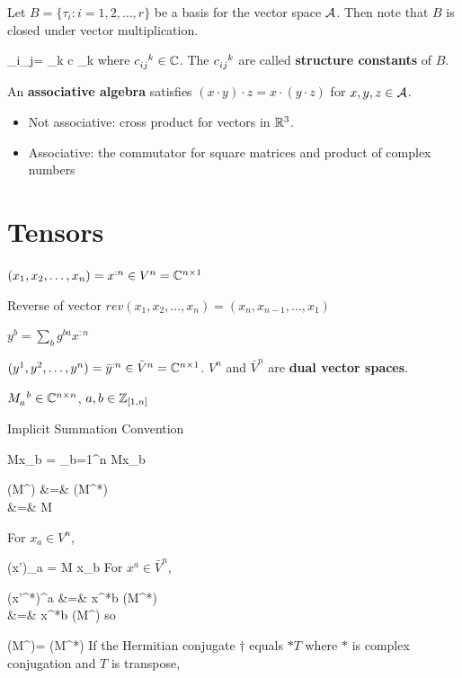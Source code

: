 Let $B = \{\tau_i: i=1, 2, \ldots, r\}$
be a basis for the vector space ${\cal A}$. 
Then note that
$B$ is closed under vector multiplication. 

\beq
\tau_i\cdot \tau_j=
\sum_k c \tau_k
\eeq
where $c\indices{_{ij}^k}\in\CC$.
The $c\indices{_{ij}^k}$ are called 
{\bf structure constants} of $B$.

An {\bf associative algebra} satisfies 
$(x\cdot y)\cdot z = x\cdot(y\cdot z)$ for
$x,y,z\in {\cal A}$.
\begin{itemize}
\item Not associative: cross product for vectors in  ${ \mathbb{R}}^3$.
\item Associative:
the commutator for square matrices and product of complex numbers
\end{itemize}

\section{Tensors}

$(x_1, x_2, \ldots, x_n) = x^{:n}\in V^n={ \mathbb{C}}^{n\times 1}$

Reverse of vector $rev(x_1, x_2, \ldots, x_n)=
(x_n, x_{n-1},
\ldots, x_1)$

$y^b = \sum_b g^{ba}x^{:n}$

$(y^1, y^2, \ldots, y^n)= \bar{y}^{:n}\in \bar{V}^n={ \mathbb{C}}^{n\times 1}$. $V^n$ and
$\bar{V}^n$ are {\bf dual vector spaces}.



$M\indices{_a^b}\in \CC^{n\times n}$, $a, b\in{\mathbb{Z}}_{[1,n]}$

Implicit Summation Convention

\beq
Mx_b = \sum_{b=1}^n
Mx_b
\eeq

\beqa
(M^\dagger) &=& (M^*)
\\
&=&
M
\quad {}
\eeqa

For $x_a\in V^n$,

\beq
(x')_a = M x_b
\eeq
For $x^a\in \bar{V}^{n}$, 



\beqa
(x'^*)^a &=& x^{*b} (M^*)
\\
&=&
x^{*b} (M^\dagger)
\eeqa
so

\beq
(M^\dagger)=
(M^*)
\eeq
If the Hermitian conjugate $\dagger$
equals $*T$ where $*$ is complex conjugation and $T$ is transpose,

